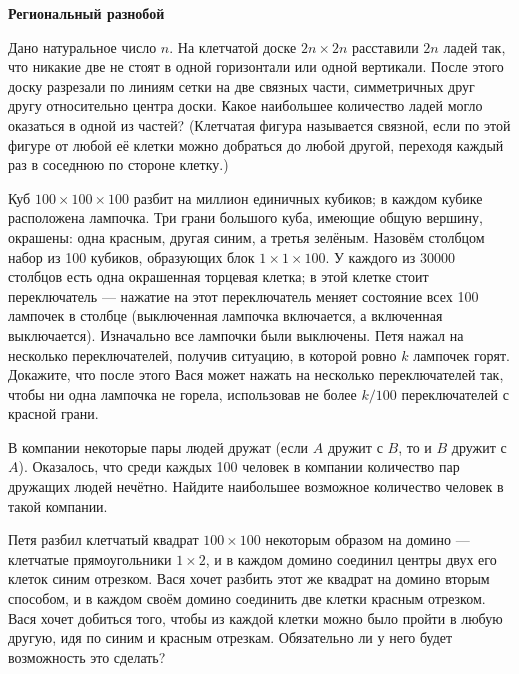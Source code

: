 \documentclass{article}
\begin{document}
    \large

    \begin{center}
        \textbf{Региональный разнобой}
    \end{center}


    \begin{enumerate_boxed}

        \item Дано натуральное число $n$.
        На клетчатой доске $2n \times 2n$ расставили $2n$ ладей так, что никакие две не стоят в одной горизонтали или одной вертикали.
        После этого доску разрезали по линиям сетки на две связных части, симметричных друг другу относительно центра доски.
        Какое наибольшее количество ладей могло оказаться в одной из частей?
        (Клетчатая фигура называется связной, если по этой фигуре от любой её клетки можно добраться до любой другой, переходя каждый раз в соседнюю
        по стороне клетку.)

        \item Куб $100 \times 100 \times 100$ разбит на миллион единичных кубиков; в
        каждом кубике расположена лампочка.
        Три грани большого куба, имеющие общую вершину, окрашены: одна красным, другая синим, а третья зелёным.
        Назовём столбцом набор из 100 кубиков, образующих блок $1\times 1\times 100$.
        У каждого из 30000 столбцов есть одна окрашенная торцевая клетка; в этой клетке стоит переключатель — нажатие на этот переключатель меняет состояние всех 100 лампочек в столбце (выключенная лампочка включается, а включенная выключается).
        Изначально все лампочки были выключены.
        Петя нажал на несколько переключателей, получив ситуацию, в которой ровно $k$ лампочек горят.
        Докажите, что после этого Вася может нажать на несколько переключателей так, чтобы ни одна лампочка не горела, использовав не более $k/100$ переключателей с красной грани.

        \item  В компании некоторые пары людей дружат (если $A$ дружит с $B$, то и $B$ дружит с $A$). Оказалось, что среди каждых 100 человек в компании количество пар дружащих людей нечётно.
        Найдите наибольшее возможное количество человек в такой компании.

        \item  Петя разбил клетчатый квадрат $100 \times 100$ некоторым образом на домино — клетчатые прямоугольники $1 \times 2$, и в каждом домино соединил центры двух его клеток синим отрезком.
        Вася хочет разбить этот же квадрат на домино вторым способом, и в каждом своём домино соединить две клетки красным отрезком.
        Вася хочет добиться того, чтобы из каждой клетки можно было пройти в любую другую, идя по синим и красным отрезкам.
        Обязательно ли у него будет возможность это сделать?


\end{enumerate_boxed}
\end{document}
